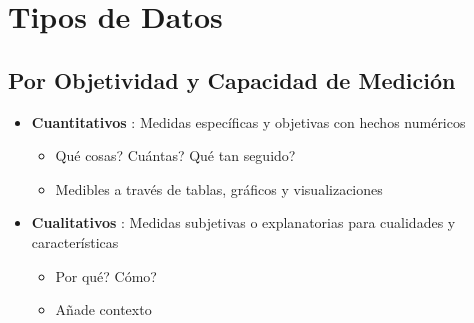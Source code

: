 \section{Tipos de Datos}

\subsection{Por Objetividad y Capacidad de Medición}
\begin{itemize}
    \item {\textbf{Cuantitativos} : Medidas específicas y objetivas con hechos numéricos
    \begin{itemize}
        \item {Qué cosas? Cuántas? Qué tan seguido?}
        \item {Medibles a través de tablas, gráficos y visualizaciones}
    \end{itemize}}
    \item {\textbf{Cualitativos} : Medidas subjetivas o explanatorias para cualidades y características
    \begin{itemize}
        \item {Por qué? Cómo?}
        \item {Añade contexto}
    \end{itemize}}
\end{itemize}

